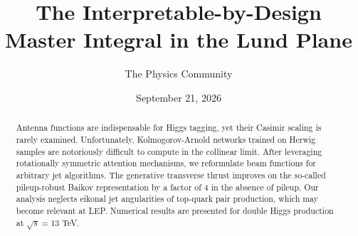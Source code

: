 \documentclass[11pt]{article}
\title{The Interpretable-by-Design Master Integral in the Lund Plane}
\author{The Physics Community}
\date{September 21, 2026}
\numberwithin{equation}{section}
\theoremstyle{definition}
\theoremstyle{remark}
\begin{document}
\maketitle
\begin{abstract}
Antenna functions are indispensable for Higgs tagging, yet their Casimir
scaling is rarely examined. Unfortunately, Kolmogorov-Arnold networks
trained on Herwig samples are notoriously difficult to compute in the
collinear limit. After leveraging rotationally symmetric attention
mechanisms, we reformulate beam functions for arbitrary jet algorithms.
The generative transverse thrust improves on the so-called pileup-robust
Baikov representation by a factor of 4 in the absence of pileup. Our
analysis neglects eikonal jet angularities of top-quark pair production,
which may become relevant at LEP. Numerical results are presented for
double Higgs production at $\sqrt{s} = 13$ TeV.
\end{abstract}
\tableofcontents



\nocite{*}


\end{document}
